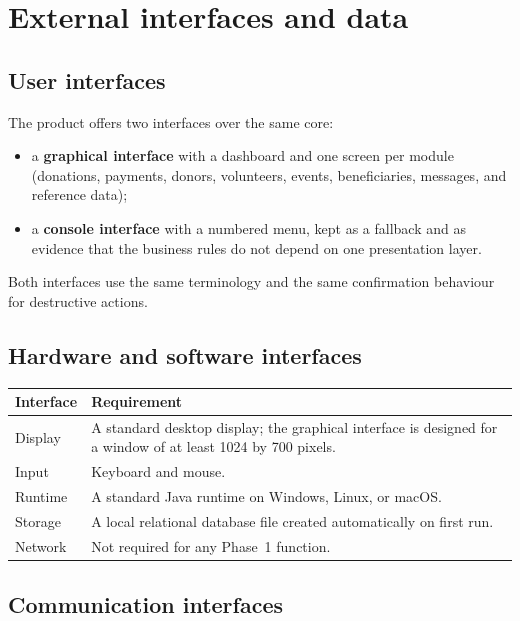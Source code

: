 \section{External interfaces and data}

\subsection{User interfaces}

The product offers two interfaces over the same core:

\begin{itemize}
  \item a \textbf{graphical interface} with a dashboard and one screen per module (donations, payments, donors, volunteers, events, beneficiaries, messages, and reference data);
  \item a \textbf{console interface} with a numbered menu, kept as a fallback and as evidence that the business rules do not depend on one presentation layer.
\end{itemize}

Both interfaces use the same terminology and the same confirmation behaviour for destructive actions.

\subsection{Hardware and software interfaces}

\begin{center}
\small
\begin{tabularx}{\textwidth}{@{}L{0.24\textwidth}Y@{}}
\toprule
\textbf{Interface} & \textbf{Requirement} \\
\midrule
Display & A standard desktop display; the graphical interface is designed for a window of at least 1024 by 700 pixels. \\
Input & Keyboard and mouse. \\
Runtime & A standard Java runtime on Windows, Linux, or macOS. \\
Storage & A local relational database file created automatically on first run. \\
Network & Not required for any Phase~1 function. \\
\bottomrule
\end{tabularx}
\end{center}

\subsection{Communication interfaces}

